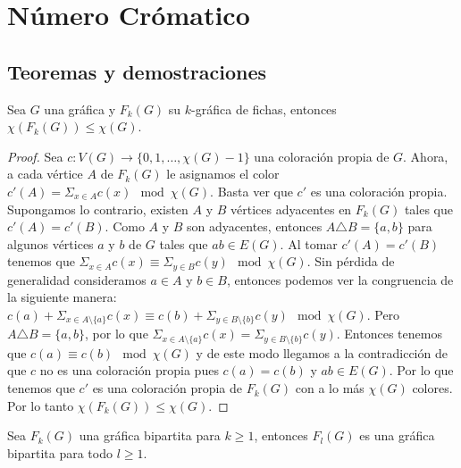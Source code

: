 \chapter{N\'umero Cr\'omatico}%
\label{cap:num cromatico}

\section{Teoremas y demostraciones}%


\begin{teorema}
\label{teo:num cromatico de G y F(G)}
    Sea $G$ una gr\'afica y $F_k(G)$ su $k$-gr\'afica de fichas, entonces
    $\chi(F_k(G)) \leq \chi (G)$.
\end{teorema}

\begin{proof}
    Sea $c: V(G) \to \{0,1, \dots, \chi(G)-1\}$ una coloraci\'on propia de $G$.
    Ahora, a cada v\'ertice $A$ de $F_k(G)$ le asignamos el color $ c'(A)=
    \Sigma_{x \in A}c(x) \mod \chi(G)$. Basta ver que $c'$ es una coloraci\'on
    propia. Supongamos lo contrario, existen $A$ y $B$ v\'ertices adyacentes en
    $F_k(G)$ tales que $c'(A) = c'(B)$. Como $A$ y $B$ son adyacentes, entonces
    $A \triangle B = \{a,b\}$ para algunos v\'ertices $a$ y $b$ de $G$ tales que
    $ab \in E(G)$. Al tomar $c'(A) = c'(B)$ tenemos que $\Sigma_{x \in A}c(x)
    \equiv \Sigma_{y \in B}c(y) \mod \chi(G)$. Sin p\'erdida de generalidad
    consideramos $a \in A$ y $b \in B$, entonces podemos ver la congruencia de
    la siguiente manera: $c(a) + \Sigma_{x \in A \setminus\{a\}}c(x) \equiv c(b)
    + \Sigma_{y \in B\setminus\{b\}}c(y) \mod \chi(G)$. Pero $A \triangle B =
    \{a,b\}$, por lo que $\Sigma_{x \in A\setminus\{a\}}c(x)=\Sigma_{y \in
    B\setminus\{b\}}c(y)$. Entonces tenemos que $c(a) \equiv c(b) \mod \chi(G)$
    y de este modo llegamos a la contradicci\'on de que $c$ no es una
    coloraci\'on propia pues $c(a) = c(b)$ y $ab \in E(G)$. Por lo que tenemos
    que $c'$ es una coloraci\'on propia de $F_k(G)$ con a lo m\'as $\chi (G)$
    colores. Por lo tanto $\chi(F_k(G)) \leq \chi (G)$.
\end{proof}

\begin{proposicion}
\label{prop:biparticion F(G)}
    Sea $F_k(G)$ una gr\'afica bipartita para $k \geq 1$, entonces $F_l(G)$
    es una gr\'afica bipartita para todo $l \geq 1$.
\end{proposicion}

